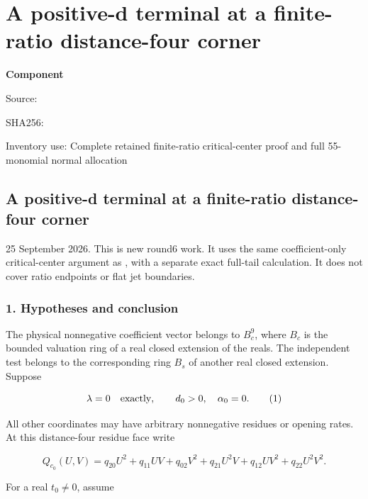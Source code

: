 \chapter{A positive-d terminal at a finite-ratio distance-four corner}
\label{component:p03b551f2a9a0}
\noindent\textbf{Component }\par
{\small\noindent Source: \par}
{\small\noindent SHA256: \par}
{\small\noindent Inventory use: Complete retained finite-ratio critical-center proof and full 55-monomial normal allocation\par}
\medskip
\hypertarget{a-positive-d-terminal-at-a-finite-ratio-distance-four-corner}{%
\section{A positive-d terminal at a finite-ratio distance-four corner}\label{p03b551f2a9a0:a-positive-d-terminal-at-a-finite-ratio-distance-four-corner}}

25 September 2026. This is new round6 work. It uses the same coefficient-only
critical-center argument as , with a
separate exact full-tail calculation. It does not cover ratio endpoints or
flat jet boundaries.

\hypertarget{hypotheses-and-conclusion}{%
\subsection{1. Hypotheses and conclusion}\label{p03b551f2a9a0:hypotheses-and-conclusion}}

The physical nonnegative coefficient vector belongs to \(B_c^9\), where
\(B_c\) is the bounded valuation ring of a real closed extension of the
reals. The independent test belongs to the corresponding ring \(B_s\) of
another real closed extension. Suppose

\[
\lambda=0\quad\hbox{exactly},\qquad d_0>0,\quad\alpha_0=0.
\tag{1}
\]

All other coordinates may have arbitrary nonnegative residues or opening
rates. At this distance-four residue face write

\[
Q_{c_0}(U,V)=q_{20}U^2+q_{11}UV+q_{02}V^2
+q_{21}U^2V+q_{12}UV^2+q_{22}U^2V^2.
\]

For a real \(t_0\ne0\), assume

